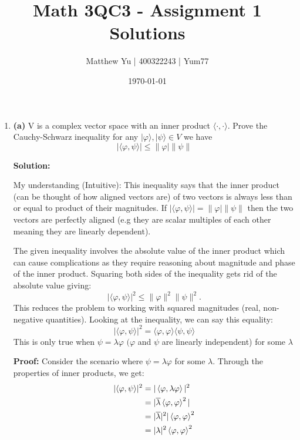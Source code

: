 \documentclass{article}
\renewcommand{\phi}{\varphi}
\theoremstyle{plain}
\numberwithin{thm}{section}
\theoremstyle{definition}
\begin{document}
\title{Math 3QC3 - Assignment 1 Solutions}
\author{Matthew Yu | 400322243 | Yum77}
\date{\today}
\maketitle



\begin{enumerate}
 
    \item \textbf{(a)} V is a complex vector space with an inner product $\langle \cdot, \cdot \rangle$. Prove the Cauchy-Schwarz inequality for any $| \varphi \rangle, | \psi \rangle \in V$ we have $$\left| \langle \phi, \psi \rangle \right| \leq \|\phi| \|\psi\|$$

    \textbf{Solution:}  

    My understanding (Intuitive): This inequality says that the inner product (can be thought of how aligned vectors are) of two vectors is always less than  or equal to product of their magnitudes. If $|\langle \phi, \psi \rangle| = \|\phi|\|\psi \|$ then the two vectors are perfectly aligned (e.g they are scalar multiples of each other meaning they are linearly dependent). 
    
    The given inequality involves the absolute value of the inner product which can cause complications as they require reasoning about magnitude and phase of the inner product. Squaring both sides of the inequality gets rid of the absolute value giving: $$| \langle \phi, \psi \rangle |^2 \leq \| \phi \|^2 \| \psi \|^2.$$
    This reduces the problem to working with squared magnitudes (real, non-negative quantities). Looking at the inequality, we can say this equality: $$| \langle \phi, \psi \rangle |^2 = \langle \phi, \phi \rangle \langle \psi, \psi \rangle$$
    This is only true when $\psi = \lambda \phi$ $(\phi$ and $\psi$ are linearly independent) for some $\lambda$

    \textbf{Proof:} Consider the scenario where $\psi = \lambda \phi$ for some $\lambda$. Through the properties of inner products, we get: 
    \begin{align*}
        | \langle \phi, \psi \rangle |^2 &= | \braket{\phi, \lambda \phi} |^2 \\
        & = | \overline{\lambda} \braket{\phi, \phi}^2 | \\
        & =|\overline{\lambda}|^2|\braket{\phi, \phi}^2 \\
        & = |\lambda|^2\braket{\phi, \phi}^2
    \end{align*}


\end{enumerate}
\end{document}
